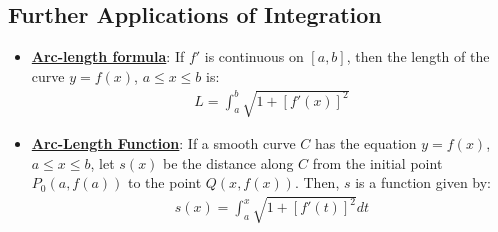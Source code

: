 \documentclass[11pt]{article}
\newcommand{\dfn}[1]{\underline{\textbf{#1}}}
\begin{document}
\subsection{Further Applications of Integration}
\begin{itemize}[noitemsep]
	\item \dfn{Arc-length formula}: If $f'$ is continuous on $[a,b]$, then the length of the curve $y=f(x)$, $a \leq x \leq b$ is: 
	\begin{align}
		L = \int_a^b \sqrt{1+ [ f'(x)]^2}	
	\end{align}
	\item \dfn{Arc-Length Function}: If a smooth curve $C$ has the equation $y=f(x)$, $ a \leq x \leq b$, let $s(x)$ be the distance along $C$ from the initial point $P_0(a, f(a))$ to the point $Q(x, f(x))$. Then, $s$ is a function given by: 
	\begin{align}
		s(x) = \int_a^x \sqrt{1+ [f'(t)]^2} dt 	
	\end{align}
\end{itemize}
\end{document}
